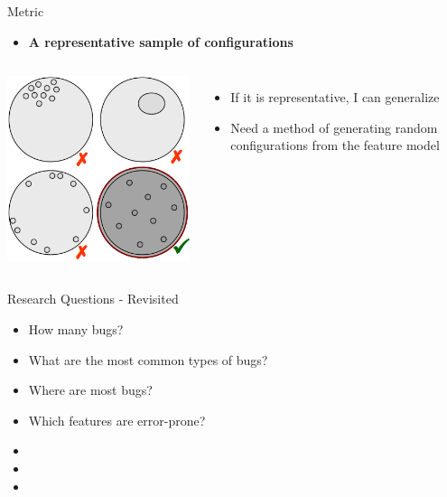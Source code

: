 \documentclass[mathserif,serif]{beamer}
\newenvironment{items}{
\begin{itemize}
  \setlength{\itemsep}{0pt}
  \setlength{\parskip}{7pt}
  \setlength{\parsep}{4pt}
}{\end{itemize}}
\begin{document}
\begin{frame}[t]{Metric}

    \begin{items}
        \item \textbf{A representative sample of configurations}
    \end{items}

    \begin{columns}[T]
        \includegraphics[scale=.5]{sample.png}
        \pause
        \begin{items}
            \item If it is representative, I can generalize
            \pause
            \item Need a method of generating random configurations from the 
                        feature model
        \end{items}
    \end{columns}
\end{frame}

\begin{frame}[t]{Research Questions - Revisited}

    \begin{items}
        \item How many bugs?
        \item What are the most common types of bugs?
        \item Where are most bugs?
        \item Which features are error-prone?
        \pause
        \item \color{red}{... Additional questions?}
        \item \color{red}{... Prioritization?}
        \item \color{red}{... Take 2 minutes to brainstorm about it}
    \end{items}
\end{frame}
\end{document}
